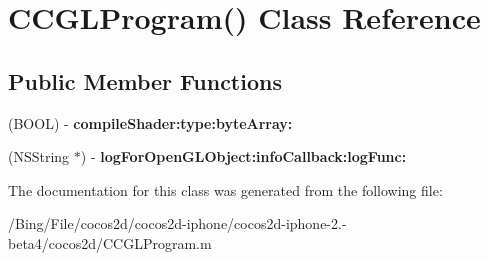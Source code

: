 \hypertarget{interface_c_c_g_l_program_07_08}{\section{C\-C\-G\-L\-Program() Class Reference}
\label{interface_c_c_g_l_program_07_08}
}
\subsection*{Public Member Functions}
\begin{DoxyCompactItemize}
\item 
\hypertarget{interface_c_c_g_l_program_07_08_a6b95e412d3da3a0ea8a2afe03f7d7267}{(B\-O\-O\-L) -\/ {\bfseries compile\-Shader\-:type\-:byte\-Array\-:}}\label{interface_c_c_g_l_program_07_08_a6b95e412d3da3a0ea8a2afe03f7d7267}

\item 
\hypertarget{interface_c_c_g_l_program_07_08_a6ce15650a9bf024541d28f87a4325d58}{(N\-S\-String $\ast$) -\/ {\bfseries log\-For\-Open\-G\-L\-Object\-:info\-Callback\-:log\-Func\-:}}\label{interface_c_c_g_l_program_07_08_a6ce15650a9bf024541d28f87a4325d58}

\end{DoxyCompactItemize}


The documentation for this class was generated from the following file\-:\begin{DoxyCompactItemize}
\item 
/\-Bing/\-File/cocos2d/cocos2d-\/iphone/cocos2d-\/iphone-\/2.-\/beta4/cocos2d/C\-C\-G\-L\-Program.\-m\end{DoxyCompactItemize}
